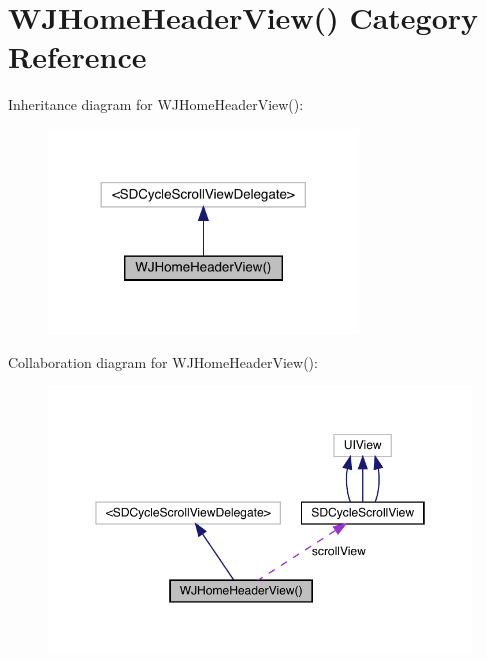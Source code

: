 \hypertarget{category_w_j_home_header_view_07_08}{}\section{W\+J\+Home\+Header\+View() Category Reference}
\label{category_w_j_home_header_view_07_08}


Inheritance diagram for W\+J\+Home\+Header\+View()\+:\nopagebreak
\begin{figure}[H]
\begin{center}
\leavevmode
\includegraphics[width=233pt]{category_w_j_home_header_view_07_08__inherit__graph}
\end{center}
\end{figure}


Collaboration diagram for W\+J\+Home\+Header\+View()\+:\nopagebreak
\begin{figure}[H]
\begin{center}
\leavevmode
\includegraphics[width=350pt]{category_w_j_home_header_view_07_08__coll__graph}
\end{center}
\end{figure}
